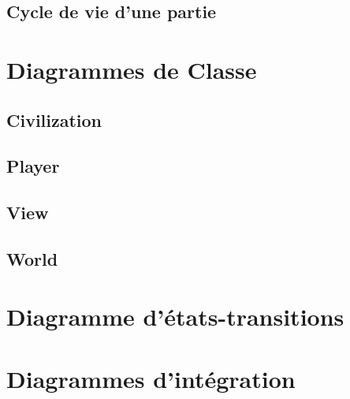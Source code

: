 	
	\subsection{Cycle de vie d'une partie}


	
\section{Diagrammes de Classe}
	\subsection{Civilization}
	\subsection{Player}
	\subsection{View}
	\subsection{World}
	
	
\section{Diagramme d'états-transitions}

\section{Diagrammes d'intégration}







































